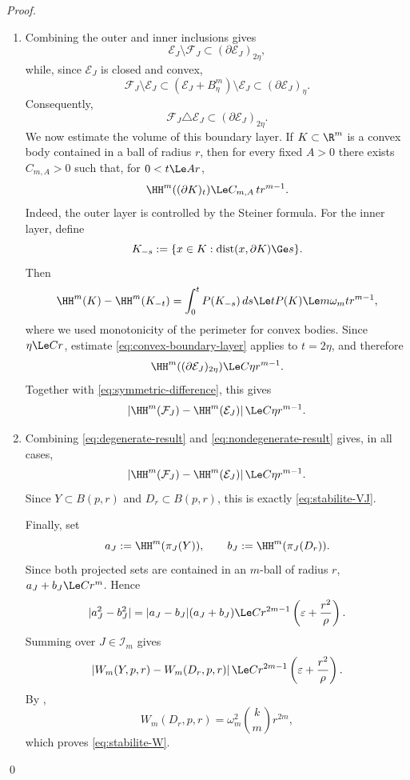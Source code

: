 \begin{proof}
\begin{enumerate}
\item Combining the outer and inner inclusions gives
\[
 \mathcal E_J\setminus\mathcal F_J
 \subset(\partial\mathcal E_J)_{2\eta},
\]
while, since $\mathcal E_J$ is closed and convex,
\[
 \mathcal F_J\setminus\mathcal E_J
 \subset(\mathcal E_J+B^m_\eta)\setminus\mathcal E_J
 \subset(\partial\mathcal E_J)_\eta.
\]
Consequently,
\begin{equation}
\label{eq:symmetric-difference}
 \mathcal F_J\triangle\mathcal E_J
 \subset(\partial\mathcal E_J)_{2\eta}.
\end{equation}
We now estimate the volume of this boundary layer. If
$K\subset\R^m$ is a convex body contained in a ball of radius $r$, then
for every fixed $A>0$ there exists $C_{m,A}>0$ such that, for
$0<t\Le Ar$,
\begin{equation}
\label{eq:convex-boundary-layer}
 \HH^m((\partial K)_t)\Le C_{m,A}\,t r^{m-1}.
\end{equation}
Indeed, the outer layer is controlled by the Steiner formula. For the
inner layer, define
\[
 K_{-s}:=\{x\in K:\operatorname{dist}(x,\partial K)\Ge s\}.
\]
Then
\[
 \HH^m(K)-\HH^m(K_{-t})
 =\int_0^t P(K_{-s})\,ds
 \Le tP(K)
 \Le m\omega_m t r^{m-1},
\]
where we used monotonicity of the perimeter for convex bodies. Since
$\eta\Le Cr$, estimate \eqref{eq:convex-boundary-layer} applies to
$t=2\eta$, and therefore
\[
 \HH^m((\partial\mathcal E_J)_{2\eta})
 \Le C\eta r^{m-1}.
\]
Together with \eqref{eq:symmetric-difference}, this gives
\begin{equation}
\label{eq:nondegenerate-result}
 \left|\HH^m(\mathcal F_J)-\HH^m(\mathcal E_J)\right|
 \Le C\eta r^{m-1}.
\end{equation}

\item Combining \eqref{eq:degenerate-result} and
\eqref{eq:nondegenerate-result} gives, in all cases,
\[
 \left|\HH^m(\mathcal F_J)-\HH^m(\mathcal E_J)\right|
 \Le C\eta r^{m-1}.
\]
Since $Y\subset B(p,r)$ and $D_r\subset B(p,r)$, this is exactly
\eqref{eq:stabilite-VJ}.

Finally, set
\[
 a_J:=\HH^m(\pi_J(Y)),\qquad
 b_J:=\HH^m(\pi_J(D_r)).
\]
Since both projected sets are contained in an $m$-ball of radius $r$,
$a_J+b_J\Le Cr^m$. Hence
\[
 |a_J^2-b_J^2|
 =|a_J-b_J|(a_J+b_J)
 \Le C r^{2m-1}\left(\varepsilon+\frac{r^2}{\rho}\right).
\]
Summing over $J\in\mathcal I_m$ gives
\[
 \left|W_m(Y,p,r)-W_m(D_r,p,r)\right|
 \Le C r^{2m-1}\left(\varepsilon+\frac{r^2}{\rho}\right).
\]
By ,
\[
 W_m(D_r,p,r)=\omega_m^2\binom{k}{m}r^{2m},
\]
which proves \eqref{eq:stabilite-W}.
\end{enumerate}
\qed
\end{proof}


